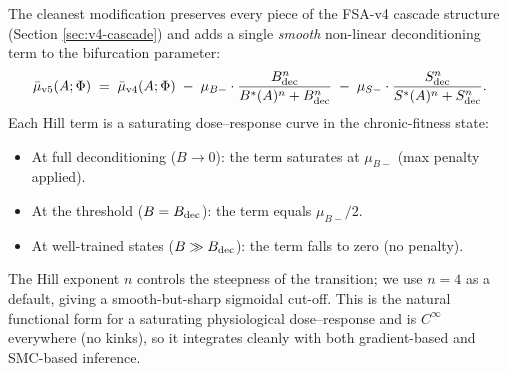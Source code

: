 The cleanest modification preserves every piece of the FSA-v4 cascade structure (Section \ref{sec:v4-cascade}) and adds a single \emph{smooth} non-linear deconditioning term to the bifurcation parameter:
\begin{equation}
\bar\mu_{\rm v5}(A;\Phi) \;=\; \bar\mu_{\rm v4}(A;\Phi) \;-\; \mu_{B-} \cdot \frac{B_{\rm dec}^{n}}{B^*(A)^{n} + B_{\rm dec}^{n}} \;-\; \mu_{S-} \cdot \frac{S_{\rm dec}^{n}}{S^*(A)^{n} + S_{\rm dec}^{n}}.
\label{eq:v5-mubar}
\end{equation}
Each Hill term is a saturating dose--response curve in the chronic-fitness state:
\begin{itemize}
  \item At full deconditioning ($B \to 0$): the term saturates at $\mu_{B-}$ (max penalty applied).
  \item At the threshold ($B = B_{\rm dec}$): the term equals $\mu_{B-}/2$.
  \item At well-trained states ($B \gg B_{\rm dec}$): the term falls to zero (no penalty).
\end{itemize}
The Hill exponent $n$ controls the steepness of the transition; we use $n = 4$ as a default, giving a smooth-but-sharp sigmoidal cut-off. This is the natural functional form for a saturating physiological dose--response and is $C^\infty$ everywhere (no kinks), so it integrates cleanly with both gradient-based and SMC-based inference.

